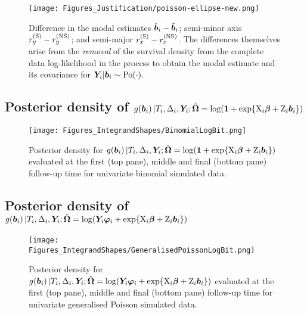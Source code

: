 \begin{figure}[ht]
    \centering
    \texttt{[image: Figures\_Justification/poisson-ellipse-new.png]}
    \caption{Difference in the modal estimates $\hat{\bm{b}}_i-\tilde{\bm{b}}_i$; semi-minor axis $r_y^{(\mathrm{S})}-r_y^{(\mathrm{NS})}$; and semi-major $r_x^{(\mathrm{S})}-r_x^{(\mathrm{NS})}$. The differences themselves arise from the \textit{removal} of the survival density from the complete data log-likelihood in the process to obtain the modal estimate and its covariance for $\bm{Y}_i|\bm{b}_i\sim\mathrm{Po}\!\left(\cdot\right)$.}
    \label{fig:appendix-justification-ellipse-poisson}
\end{figure}

\clearpage
\subsection{Posterior density of \texorpdfstring{$g\!\left(\bm{b}_i\right)|T_i,\Delta_i,\bm{Y}_i;\hat{\bm{\Omega}}=\log\!\left(\bm{1}+\exp\!\left\{\mathrm{X}_i\bm{\beta}+\mathrm{Z}_i\bm{b}_i\right\}\right)$}{binomial}}\label{sec:appendix-suppfigs-justification-binomallogbit}
\begin{figure}[ht]
  \centering
  \texttt{[image: Figures\_IntegrandShapes/BinomialLogBit.png]}
  \caption{Posterior density for $g\!\left(\bm{b}_i\right)|T_i,\Delta_i,\bm{Y}_i;\hat{\bm{\Omega}}=\log\!\left(\bm{1}+\exp\!\left\{\mathrm{X}_i\bm{\beta}+\mathrm{Z}_i\bm{b}_i\right\}\right)$ evaluated at the first (top pane), middle and final (bottom pane) follow-up time for univariate binomial simulated data.}
  \label{fig:appendix-justification-integrands-binquantity}
\end{figure}
\clearpage
\subsection{Posterior density of \texorpdfstring{$g\!\left(\bm{b}_i\right)|T_i,\Delta_i,\bm{Y}_i;\hat{\bm{\Omega}}=\log\!\left(\bm{Y}_i\bm{\varphi}_i+\exp\!\left\{\mathrm{X}_i\bm{\beta}+\mathrm{Z}_i\bm{b}_i\right\}\right)$}{genpois}}\label{sec:appendix-suppfigs-justification-GP1logbit}
\begin{figure}[ht]
  \centering
  \texttt{[image: Figures\_IntegrandShapes/GeneralisedPoissonLogBit.png]}
  \caption{Posterior density for $g\!\left(\bm{b}_i\right)|T_i,\Delta_i,\bm{Y}_i;\hat{\bm{\Omega}}=\log\!\left(\bm{Y}_i\bm{\varphi}_i+\exp\!\left\{\mathrm{X}_i\bm{\beta}+\mathrm{Z}_i\bm{b}_i\right\}\right)$ evaluated at the first (top pane), middle and final (bottom pane) follow-up time for univariate generalised Poisson simulated data.}
  \label{fig:appendix-justification-integrands-GP1quantity}
\end{figure}
\clearpage

